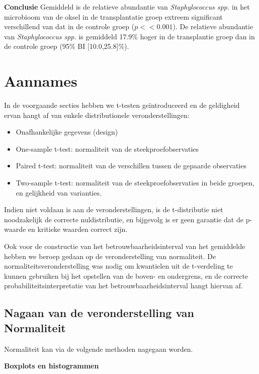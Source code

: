 \documentclass[12pt,dutch,coursenotes]{book}
\providecommand{\tightlist}{%
  \setlength{\itemsep}{0pt}\setlength{\parskip}{0pt}}
\theoremstyle{definition}
\theoremstyle{definition}
\theoremstyle{definition}
\theoremstyle{remark}
\begin{document}
\textbf{Conclusie} Gemiddeld is de relatieve abundantie van
\emph{Staphylococcus spp.} in het microbioom van de oksel in de
transplantatie groep extreem significant verschillend van dat in de
controle groep (\(p<<0.001\)). De relatieve abundantie van
\emph{Staphylococcus spp.} is gemiddeld 17.9\% hoger in de transplantie
groep dan in de controle groep (95\% BI {[}10.0,25.8{]}\%).

\section{Aannames}\label{aannames}

In de voorgaande secties hebben we t-testen geïntroduceerd en de
geldigheid ervan hangt af van enkele distributionele veronderstellingen:

\begin{itemize}
\tightlist
\item
  Onafhankelijke gegevens (design)
\item
  One-sample t-test: normaliteit van de steekproefobservaties
\item
  Paired t-test: normaliteit van de verschillen tussen de gepaarde
  observaties
\item
  Two-sample t-test: normaliteit van de steekproefobservaties in beide
  groepen, en gelijkheid van varianties.
\end{itemize}

Indien niet voldaan is aan de veronderstellingen, is de t-distributie
niet noodzakelijk de correcte nuldistributie, en bijgevolg is er geen
garantie dat de p-waarde en kritieke waarden correct zijn.

Ook voor de constructie van het betrouwbaarheidsinterval van het
gemiddelde hebben we beroep gedaan op de veronderstelling van
normaliteit. De normaliteitsveronderstelling was nodig om kwantielen uit
de t-verdeling te kunnen gebruiken bij het opstellen van de boven- en
ondergrens, en de correcte probabiliteitsinterpretatie van het
betrouwbaarheidsinterval hangt hiervan af.

\subsection{Nagaan van de veronderstelling van
Normaliteit}\label{nagaan-van-de-veronderstelling-van-normaliteit}

Normaliteit kan via de volgende methoden nagegaan worden.

\textbf{Boxplots en histogrammen}
\end{document}
